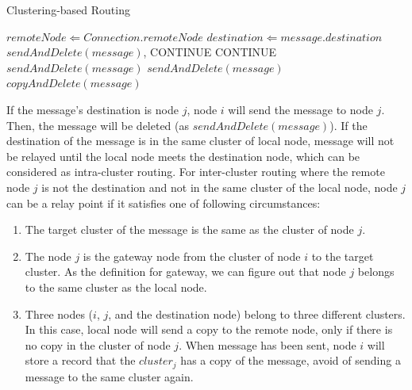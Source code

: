 \documentclass[conference]{IEEEtran}
\begin{document}
\begin{algorithm}
\caption{Clustering-based Routing}\label{algorithm_routing_procedure}
\begin{algorithmic}
        \STATE $remoteNode \Leftarrow Connection.remoteNode$
            \STATE $destination \Leftarrow message.destination$
                \STATE $sendAndDelete(message)$, CONTINUE
            \ENDIF
                \STATE CONTINUE
           \ENDIF
                \STATE $sendAndDelete(message)$
                   \STATE $sendAndDelete(message)$
                \ENDIF
            \ELSE
                \STATE $copyAndDelete(message)$
             \ENDIF
        \ENDFOR
    \ENDIF
\end{algorithmic}
\end{algorithm}

If the message's destination is node $j$,  node $i$ will send the message to node $j$. Then, the message will be deleted (as $sendAndDelete(message)$). If the destination of the message is in the same cluster of local node, message will not be relayed until the local node meets the destination node, which can be considered as intra-cluster routing. For inter-cluster routing where the remote node $j$ is not the destination and not in the same cluster of the local node, node $j$ can be a relay point if it satisfies one of following circumstances:
\begin{enumerate}
      \item The target cluster of the message is the same as the cluster of node $j$.
      \item The node $j$ is the gateway node from the cluster of node $i$ to the target cluster. As the definition for gateway, we can figure out that node $j$ belongs to the same cluster as the local node.
      \item Three nodes ($i$, $j$, and the destination node) belong to three different clusters. In this case, local node will send a copy to the remote node, only if there is no copy in the cluster of node $j$. When message has been sent, node $i$ will store a record that the $cluster_j$ has a copy of the message, avoid of sending a message to the same cluster again.
\end{enumerate}
\end{document}
